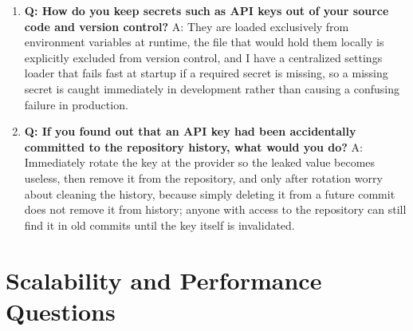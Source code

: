 \documentclass[11pt,a4paper]{report}
\begin{document}
\begin{enumerate}[leftmargin=*]
\item \textbf{Q: How do you keep secrets such as API keys out of your source code and version control?}
A: They are loaded exclusively from environment variables at runtime, the file that would hold them locally is explicitly excluded from version control, and I have a centralized settings loader that fails fast at startup if a required secret is missing, so a missing secret is caught immediately in development rather than causing a confusing failure in production.

\item \textbf{Q: If you found out that an API key had been accidentally committed to the repository history, what would you do?}
A: Immediately rotate the key at the provider so the leaked value becomes useless, then remove it from the repository, and only after rotation worry about cleaning the history, because simply deleting it from a future commit does not remove it from history; anyone with access to the repository can still find it in old commits until the key itself is invalidated.
\end{enumerate}

\section{Scalability and Performance Questions}
\end{document}
